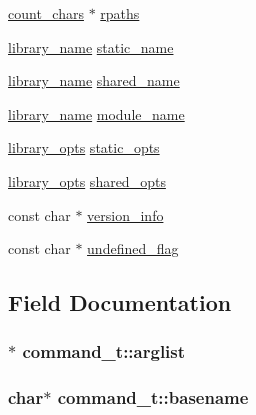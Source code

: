 \begin{DoxyCompactItemize}
\hyperlink{structcount__chars}{count\+\_\+chars} $\ast$ \hyperlink{structcommand__t_a7ccf305438f17150d10ea87f6f025f07}{rpaths}
\item 
\hyperlink{structlibrary__name}{library\+\_\+name} \hyperlink{structcommand__t_a01000f3a9b0c640de2b4e7ecf8fe963d}{static\+\_\+name}
\item 
\hyperlink{structlibrary__name}{library\+\_\+name} \hyperlink{structcommand__t_ae7710fc5599d65e7e23a09db78428189}{shared\+\_\+name}
\item 
\hyperlink{structlibrary__name}{library\+\_\+name} \hyperlink{structcommand__t_a643313eb225f71780cc53d48a2813a85}{module\+\_\+name}
\item 
\hyperlink{structlibrary__opts}{library\+\_\+opts} \hyperlink{structcommand__t_af8226723c019e4346a0e58f8cf60969f}{static\+\_\+opts}
\item 
\hyperlink{structlibrary__opts}{library\+\_\+opts} \hyperlink{structcommand__t_ae4be9b24f47470491479e1463df860cc}{shared\+\_\+opts}
\item 
const char $\ast$ \hyperlink{structcommand__t_a0481afee06e3820c8f43a5ccc7bdaed2}{version\+\_\+info}
\item 
const char $\ast$ \hyperlink{structcommand__t_a6a8b2427bbd4cb4bbe5e7470a109ebe5}{undefined\+\_\+flag}
\end{DoxyCompactItemize}


\subsection{Field Documentation}
\subsubsection[{\texorpdfstring{arglist}{arglist}}]{$\ast$ command\+\_\+t\+::arglist}\hypertarget{structcommand__t_a9b6049a8a68adcbf76ad8139fc5f965b}{}\label{structcommand__t_a9b6049a8a68adcbf76ad8139fc5f965b}
\subsubsection[{\texorpdfstring{basename}{basename}}]{\setlength{\rightskip}{0pt plus 5cm}char$\ast$ command\+\_\+t\+::basename}\hypertarget{structcommand__t_a78695c3792a2ef8e8213ea2ba378c4a2}{}\label{structcommand__t_a78695c3792a2ef8e8213ea2ba378c4a2}
